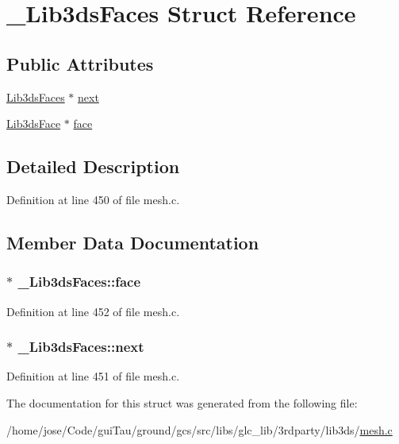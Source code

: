 \hypertarget{struct___lib3ds_faces}{\section{\-\_\-\-Lib3ds\-Faces Struct Reference}
\label{struct___lib3ds_faces}
}
\subsection*{Public Attributes}
\begin{DoxyCompactItemize}
\item 
\hyperlink{mesh_8c_aee6b17b7857e9b6b5c84801df9f6fb85}{Lib3ds\-Faces} $\ast$ \hyperlink{struct___lib3ds_faces_a2b2b981f9a62f5056803615d4ea46010}{next}
\item 
\hyperlink{struct_lib3ds_face}{Lib3ds\-Face} $\ast$ \hyperlink{struct___lib3ds_faces_a16065878b20a06a41cf8ecf45226c319}{face}
\end{DoxyCompactItemize}


\subsection{Detailed Description}


Definition at line 450 of file mesh.\-c.



\subsection{Member Data Documentation}
\hypertarget{struct___lib3ds_faces_a16065878b20a06a41cf8ecf45226c319}{
\subsubsection[{face}]{$\ast$ \-\_\-\-Lib3ds\-Faces\-::face}}\label{struct___lib3ds_faces_a16065878b20a06a41cf8ecf45226c319}


Definition at line 452 of file mesh.\-c.

\hypertarget{struct___lib3ds_faces_a2b2b981f9a62f5056803615d4ea46010}{
\subsubsection[{next}]{$\ast$ \-\_\-\-Lib3ds\-Faces\-::next}}\label{struct___lib3ds_faces_a2b2b981f9a62f5056803615d4ea46010}


Definition at line 451 of file mesh.\-c.



The documentation for this struct was generated from the following file\-:\begin{DoxyCompactItemize}
\item 
/home/jose/\-Code/gui\-Tau/ground/gcs/src/libs/glc\-\_\-lib/3rdparty/lib3ds/\hyperlink{mesh_8c}{mesh.\-c}\end{DoxyCompactItemize}
